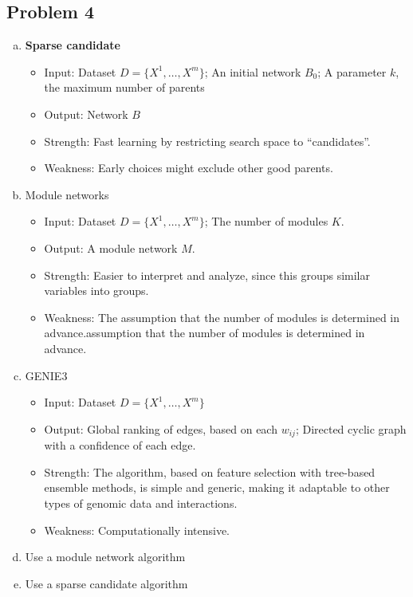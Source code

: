 \documentclass[11pt]{extarticle} %
\begin{document}
\subsection*{Problem 4}
\begin{enumerate}[(a)]
\item {\bf{Sparse candidate}}
\begin{itemize}
\item Input: Dataset $D = \{X^1, \dots, X^m \}$; An initial network $B_0$; A parameter $k$, the maximum number of parents
\item Output: Network $B$
\item Strength: Fast learning by restricting search space to ``candidates''.
\item Weakness: Early choices might exclude other good parents.
\end{itemize}
\item Module networks
\begin{itemize}
\item Input: Dataset $D = \{X^1, \dots, X^m \}$; The number of modules $K$.
\item Output: A module network $M$.
\item Strength: Easier to interpret and analyze, since this groups similar variables into groups.
\item Weakness: The assumption that the number of modules is determined in advance.assumption that the number of
modules is determined in advance.
\end{itemize}
\item GENIE3
\begin{itemize}
\item Input: Dataset $D = \{X^1, \dots, X^m \}$
\item Output: Global ranking of edges, based on each $w_{ij}$; Directed cyclic graph with a confidence of each edge.
\item Strength: The algorithm, based on feature selection with tree-based ensemble methods, is simple and generic, making it adaptable to other types of genomic data and interactions.
\item Weakness: Computationally intensive.
\end{itemize}
\item Use a module network algorithm 
\item Use a sparse candidate algorithm
\end{enumerate}
\end{document}
